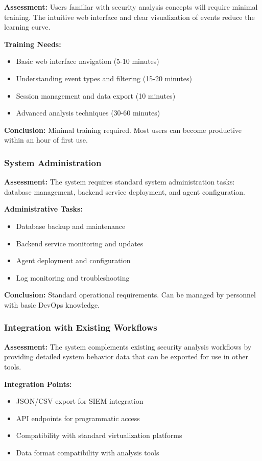 \textbf{Assessment:} Users familiar with security analysis concepts will require minimal training. The intuitive web interface and clear visualization of events reduce the learning curve.

\textbf{Training Needs:}
\begin{itemize}
    \item Basic web interface navigation (5-10 minutes)
    \item Understanding event types and filtering (15-20 minutes)
    \item Session management and data export (10 minutes)
    \item Advanced analysis techniques (30-60 minutes)
\end{itemize}

\textbf{Conclusion:} Minimal training required. Most users can become productive within an hour of first use.

\subsubsection{System Administration}

\textbf{Assessment:} The system requires standard system administration tasks: database management, backend service deployment, and agent configuration.

\textbf{Administrative Tasks:}
\begin{itemize}
    \item Database backup and maintenance
    \item Backend service monitoring and updates
    \item Agent deployment and configuration
    \item Log monitoring and troubleshooting
\end{itemize}

\textbf{Conclusion:} Standard operational requirements. Can be managed by personnel with basic DevOps knowledge.

\subsubsection{Integration with Existing Workflows}

\textbf{Assessment:} The system complements existing security analysis workflows by providing detailed system behavior data that can be exported for use in other tools.

\textbf{Integration Points:}
\begin{itemize}
    \item JSON/CSV export for SIEM integration
    \item API endpoints for programmatic access
    \item Compatibility with standard virtualization platforms
    \item Data format compatibility with analysis tools
\end{itemize}

